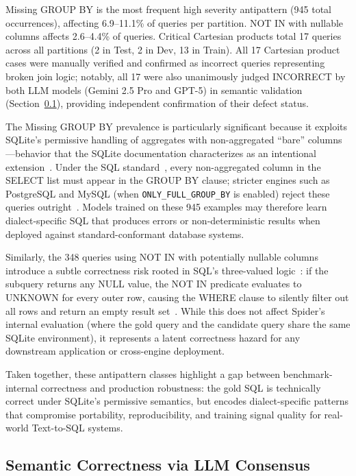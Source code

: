 \documentclass[]{einformatica}
\begin{document}
Missing GROUP BY is the most frequent high severity antipattern (945 total occurrences), affecting 6.9--11.1\% of queries per partition. NOT IN with nullable columns affects 2.6--4.4\% of queries. Critical Cartesian products total 17 queries across all partitions (2 in Test, 2 in Dev, 13 in Train). All 17 Cartesian product cases were manually verified and confirmed as incorrect queries representing broken join logic; notably, all 17 were also unanimously judged INCORRECT by both LLM models (Gemini 2.5 Pro and GPT-5) in semantic validation (Section~\ref{sec:semantic_results}), providing independent confirmation of their defect status.

The Missing GROUP BY prevalence is particularly significant because it exploits SQLite's permissive handling of aggregates with non-aggregated ``bare'' columns---behavior that the SQLite documentation characterizes as an intentional extension~\cite{sqliteBareColumns}. Under the SQL standard~\cite{iso9075_2_2016}, every non-aggregated column in the SELECT list must appear in the GROUP BY clause; stricter engines such as PostgreSQL and MySQL (when \texttt{ONLY\_FULL\_GROUP\_BY} is enabled) reject these queries outright~\cite{postgresGroupBy,mysqlGroupByHandling}. Models trained on these 945 examples may therefore learn dialect-specific SQL that produces errors or non-deterministic results when deployed against standard-conformant database systems.

Similarly, the 348 queries using NOT IN with potentially nullable columns introduce a subtle correctness risk rooted in SQL's three-valued logic~\cite{iso9075_2_2016}: if the subquery returns any NULL value, the NOT IN predicate evaluates to UNKNOWN for every outer row, causing the WHERE clause to silently filter out all rows and return an empty result set~\cite{karwin2010sqlantipatterns,date2012sqlrelational}. While this does not affect Spider's internal evaluation (where the gold query and the candidate query share the same SQLite environment), it represents a latent correctness hazard for any downstream application or cross-engine deployment.

Taken together, these antipattern classes highlight a gap between benchmark-internal correctness and production robustness: the gold SQL is technically correct under SQLite's permissive semantics, but encodes dialect-specific patterns that compromise portability, reproducibility, and training signal quality for real-world Text-to-SQL systems.

\subsection{Semantic Correctness via LLM Consensus}\label{sec:semantic_results}
\end{document}
